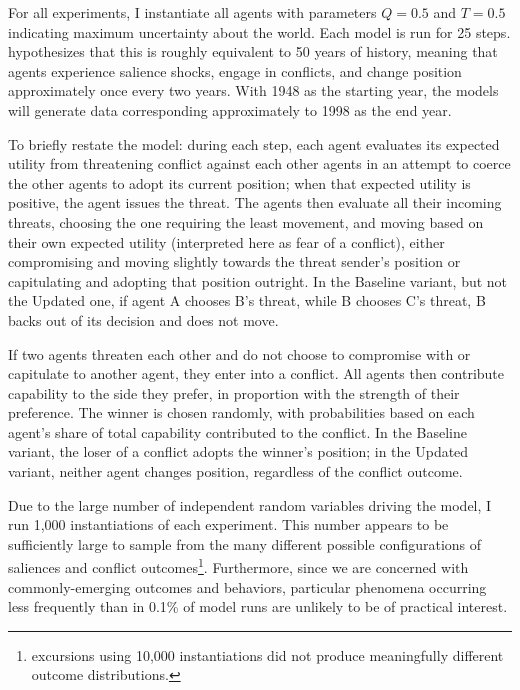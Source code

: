 For all experiments, I instantiate all agents with parameters $Q=0.5$ and $T=0.5$ indicating maximum uncertainty about the world. Each model is run for 25 steps. \citet{bdm_1998} hypothesizes that this is roughly equivalent to 50 years of history, meaning that agents experience salience shocks, engage in conflicts, and change position approximately once every two years. With 1948 as the starting year, the models will generate data corresponding approximately to 1998 as the end year.

To briefly restate the model: during each step, each agent evaluates its expected utility from threatening conflict against each other agents in an attempt to coerce the other agents to adopt its current position; when that expected utility is positive, the agent issues the threat. The agents then evaluate all their incoming threats, choosing the one requiring the least movement, and moving based on their own expected utility (interpreted here as fear of a conflict), either compromising and moving slightly towards the threat sender's position or capitulating and adopting that position outright. In the Baseline variant, but not the Updated one, if agent A chooses B's threat, while B chooses C's threat, B backs out of its decision and does not move. 

If two agents threaten each other and do not choose to compromise with or capitulate to another agent, they enter into a conflict. All agents then contribute capability to the side they prefer, in proportion with the strength of their preference. The winner is chosen randomly, with probabilities based on each agent's share of total capability contributed to the conflict. In the Baseline variant, the loser of a conflict adopts the winner's position; in the Updated variant, neither agent changes position, regardless of the conflict outcome.

Due to the large number of independent random variables driving the model, I run 1,000 instantiations of each experiment. This number appears to be  sufficiently large to sample from the many different possible configurations of saliences and conflict outcomes\footnote{excursions using 10,000 instantiations did not produce meaningfully different outcome distributions.}. Furthermore, since we are concerned with commonly-emerging outcomes and behaviors, particular phenomena occurring less frequently than in 0.1\% of model runs are unlikely to be of practical interest.



